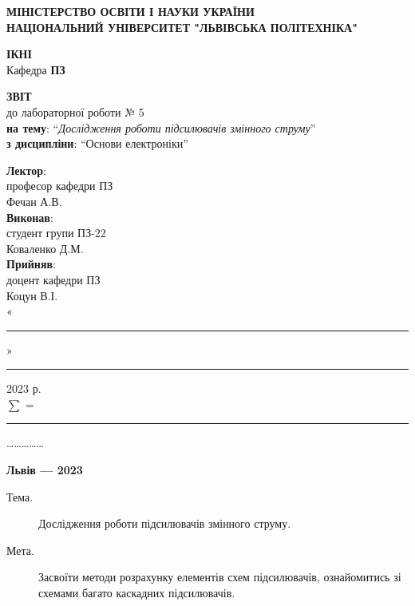 \documentclass{article}
\newcommand\subject{Основи електроніки}
\newcommand\lecturer{професор кафедри ПЗ \\ Фечан А.В.}
\newcommand\teacher{доцент кафедри ПЗ \\ Коцун В.І.}
\newcommand\mygroup{ПЗ-22}
\newcommand\lab{5}
\newcommand\theme{Дослідження роботи підсилювачів змінного струму}
\newcommand\purpose{Засвоїти методи розрахунку елементів схем підсилювачів,
	ознайомитись зі схемами багато каскадних підсилювачів}
\begin{document}
\begin{normalsize}
	\begin{titlepage}
		\thispagestyle{empty}
		\begin{center}
			\textbf{МІНІСТЕРСТВО ОСВІТИ І НАУКИ УКРАЇНИ\\
				НАЦІОНАЛЬНИЙ УНІВЕРСИТЕТ "ЛЬВІВСЬКА ПОЛІТЕХНІКА"}
		\end{center}
		\begin{flushright}
			\textbf{ІКНІ}\\
			Кафедра \textbf{ПЗ}
		\end{flushright}
		\vspace{200pt}
		\begin{center}
			\textbf{ЗВІТ}\\
			\vspace{10pt}
			до лабораторної роботи № \lab\\
			\textbf{на тему}: “\textit{\theme}”\\
			\textbf{з дисципліни}: “\subject”
		\end{center}
		\vspace{112pt}
		\begin{flushright}
			
			\textbf{Лектор}:\\
			\lecturer\\
			\vspace{28pt}
			\textbf{Виконав}:\\
			
			студент групи \mygroup\\
			Коваленко Д.М.\\
			\vspace{28pt}
			\textbf{Прийняв}:\\
			
			\teacher\\
			
			\vspace{28pt}
			«\rule{1cm}{0.15mm}» \rule{1.5cm}{0.15mm} 2023 р.\\
			$\sum$ = \rule{1cm}{0.15mm}……………\\
			
		\end{flushright}
		\vspace{\fill}
		\begin{center}
			\textbf{Львів — 2023}
		\end{center}
	\end{titlepage}
		
	\begin{description}
		\item[Тема.] \theme.
		\item[Мета.] \purpose.
	\end{description}


\end{normalsize}
\end{document}
